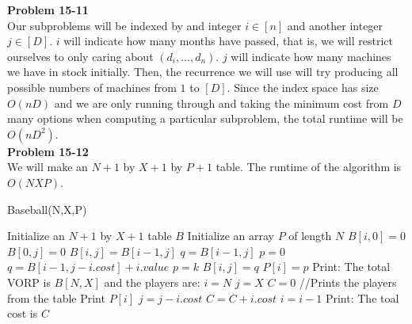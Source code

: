 \documentclass{article}
\begin{document}
\noindent\textbf{Problem 15-11}\\

Our subproblems will be indexed by and integer $i\in[n]$ and another integer $j\in[D]$. $i$ will indicate how many months have passed, that is, we will restrict ourselves to only caring about $(d_i, \ldots,d_n)$. $j$ will indicate how many machines we have in stock initially. Then, the recurrence we will use will try producing all possible numbers of machines from $1$ to $[D]$. Since the index space has size $O(nD)$ and we are only running through and taking the minimum cost from $D$ many options when computing a particular subproblem, the total runtime will be $O(nD^2)$.  \\

\noindent\textbf{Problem 15-12}\\

We will make an $N+1$ by $X+1$ by $P+1$ table. The runtime of the algorithm is $O(NXP)$.

\begin{algorithm}
\caption{Baseball(N,X,P)}
\begin{algorithmic}
\State Initialize an  $N+1$ by $X+1$ table $B$
\State Initialize an array $P$ of length $N$
	\State $B[i,0] = 0$
\EndFor
{}
	\State $B[0,j] = 0$
\EndFor
{}
			\State $B[i,j] = B[i-1,j]$
		\EndIf
		\State $q = B[i-1,j]$
		\State $p = 0$
				\State $q = B[i-1,j-i.cost] + i.value$
				\State $p = k$
			\EndIf
		\EndFor
		\State $B[i,j] = q$
		\State $P[i] = p$
	\EndFor
\EndFor
\State Print: The total VORP is $B[N,X]$ and the players are:
\State $i = N$ 
\State $j = X$
\State $C = 0$
 //Prints the players from the table
		\State Print $P[i]$
		\State $j = j - i.cost$
		\State $C = C + i.cost$
	\EndIf
	\State $i = i - 1$
\EndFor
\State Print: The toal cost is $C$
\end{algorithmic}
\end{algorithm}
\end{document}
